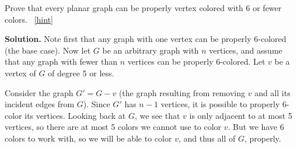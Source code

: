 \documentclass{book}
\begin{document}
\setcounter{project}{38}
\addtocounter{project}{-1}
\begin{activity}[]\label{activity-31}
\hypertarget{p-369}{}%
Prove that every planar graph can be properly vertex colored with 6 or fewer colors.%
~\hfill{\tiny\hyperlink{a-38}{[hint]}\hypertarget{q-38}{}}\par\smallskip%
\noindent\textbf{Solution.}\hypertarget{solution-37}{}\quad%
\hypertarget{p-371}{}%
Note first that any graph with one vertex can be properly 6-colored (the base case).  Now let \(G\) be an arbitrary graph with \(n\) vertices, and assume that any graph with fewer than \(n\) vertices can be properly 6-colored.  Let \(v\) be a vertex of \(G\) of degree 5 or less.%
\par
\hypertarget{p-372}{}%
Consider the graph \(G' = G - v\) (the graph resulting from removing \(v\) and all its incident edges from \(G\)).  Since \(G'\) has \(n-1\) vertices, it is possible to properly 6-color its vertices.  Looking back at \(G\), we see that \(v\) is only adjacent to at most 5 vertices, so there are at most 5 colors we cannot use to color \(v\).  But we have 6 colors to work with, so we will be able to color \(v\), and thus all of \(G\), properly.%
\end{activity}
\end{document}
